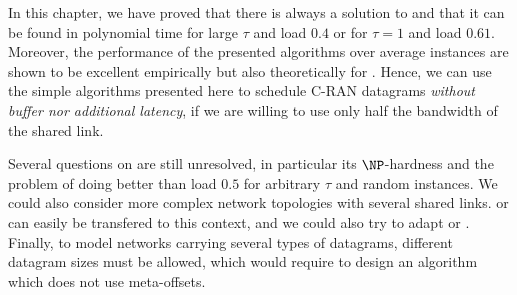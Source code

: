 In this chapter, we have proved that there is always a solution to \pma and that it can be found in polynomial time for large $\tau$ and load  $0.4$ or for $\tau = 1$ and load $0.61$. Moreover, the performance of the presented algorithms over average instances are shown to be excellent empirically but also theoretically for \greedyuniform.
Hence, we can use the simple algorithms presented here to schedule C-RAN datagrams \emph{without buffer nor additional latency}, if we are willing to use only half the bandwidth of the shared link. 

Several questions on \pma are still unresolved, in particular its $\NP$-hardness
and the problem of doing better than load $0.5$ for arbitrary $\tau$ and random instances.
We could also consider more complex network topologies with several shared links.
\firstfit or \metaoffset can easily be transfered to this context, and we could also try to adapt \compactpair or \swapandmove. Finally, to model networks carrying several types of datagrams, different datagram sizes must be allowed, which would require to design an algorithm which does not use meta-offsets. 


